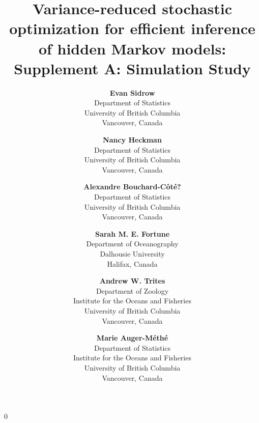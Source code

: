 \documentclass[12pt]{article}
\newcommand{\blind}{0}
\begin{document}
%

\def\spacingset#1{\renewcommand{\baselinestretch}%
{#1}\small\normalsize} \spacingset{1}


\blind
{
    \title{Variance-reduced stochastic optimization for efficient inference of hidden Markov models: Supplement A: Simulation Study}
    
    \author{
      \textbf{Evan Sidrow} \\
      Department of Statistics \\
      University of British Columbia\\
      Vancouver, Canada \\
      \and
      \textbf{Nancy Heckman} \\
      Department of Statistics \\
      University of British Columbia \\
      Vancouver, Canada \\
      \and
      \textbf{Alexandre Bouchard-C\^ot\'e?} \\
      Department of Statistics \\
      University of British Columbia \\
      Vancouver, Canada \\
      \and
      \textbf{Sarah M. E. Fortune} \\
      Department of Oceanography \\
      Dalhousie University \\
      Halifax, Canada \\
      \and
      \textbf{Andrew W. Trites} \\
      Department of Zoology \\
      Institute for the Oceans and Fisheries \\
      University of British Columbia \\
      Vancouver, Canada \\
      \and
      \textbf{Marie Auger-M\'eth\'e} \\
      Department of Statistics \\
      Institute for the Oceans and Fisheries \\
      University of British Columbia \\
      Vancouver, Canada \\
    }
    \maketitle
} \fi
\end{document}
